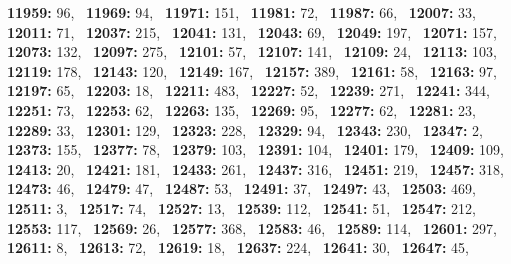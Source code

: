 \textbf{11959:} 96,\allowbreak~ 
\textbf{11969:} 94,\allowbreak~ 
\textbf{11971:} 151,\allowbreak~ 
\textbf{11981:} 72,\allowbreak~ 
\textbf{11987:} 66,\allowbreak~ 
\textbf{12007:} 33,\allowbreak~ 
\textbf{12011:} 71,\allowbreak~ 
\textbf{12037:} 215,\allowbreak~ 
\textbf{12041:} 131,\allowbreak~ 
\textbf{12043:} 69,\allowbreak~ 
\textbf{12049:} 197,\allowbreak~ 
\textbf{12071:} 157,\allowbreak~ 
\textbf{12073:} 132,\allowbreak~ 
\textbf{12097:} 275,\allowbreak~ 
\textbf{12101:} 57,\allowbreak~ 
\textbf{12107:} 141,\allowbreak~ 
\textbf{12109:} 24,\allowbreak~ 
\textbf{12113:} 103,\allowbreak~ 
\textbf{12119:} 178,\allowbreak~ 
\textbf{12143:} 120,\allowbreak~ 
\textbf{12149:} 167,\allowbreak~ 
\textbf{12157:} 389,\allowbreak~ 
\textbf{12161:} 58,\allowbreak~ 
\textbf{12163:} 97,\allowbreak~ 
\textbf{12197:} 65,\allowbreak~ 
\textbf{12203:} 18,\allowbreak~ 
\textbf{12211:} 483,\allowbreak~ 
\textbf{12227:} 52,\allowbreak~ 
\textbf{12239:} 271,\allowbreak~ 
\textbf{12241:} 344,\allowbreak~ 
\textbf{12251:} 73,\allowbreak~ 
\textbf{12253:} 62,\allowbreak~ 
\textbf{12263:} 135,\allowbreak~ 
\textbf{12269:} 95,\allowbreak~ 
\textbf{12277:} 62,\allowbreak~ 
\textbf{12281:} 23,\allowbreak~ 
\textbf{12289:} 33,\allowbreak~ 
\textbf{12301:} 129,\allowbreak~ 
\textbf{12323:} 228,\allowbreak~ 
\textbf{12329:} 94,\allowbreak~ 
\textbf{12343:} 230,\allowbreak~ 
\textbf{12347:} 2,\allowbreak~ 
\textbf{12373:} 155,\allowbreak~ 
\textbf{12377:} 78,\allowbreak~ 
\textbf{12379:} 103,\allowbreak~ 
\textbf{12391:} 104,\allowbreak~ 
\textbf{12401:} 179,\allowbreak~ 
\textbf{12409:} 109,\allowbreak~ 
\textbf{12413:} 20,\allowbreak~ 
\textbf{12421:} 181,\allowbreak~ 
\textbf{12433:} 261,\allowbreak~ 
\textbf{12437:} 316,\allowbreak~ 
\textbf{12451:} 219,\allowbreak~ 
\textbf{12457:} 318,\allowbreak~ 
\textbf{12473:} 46,\allowbreak~ 
\textbf{12479:} 47,\allowbreak~ 
\textbf{12487:} 53,\allowbreak~ 
\textbf{12491:} 37,\allowbreak~ 
\textbf{12497:} 43,\allowbreak~ 
\textbf{12503:} 469,\allowbreak~ 
\textbf{12511:} 3,\allowbreak~ 
\textbf{12517:} 74,\allowbreak~ 
\textbf{12527:} 13,\allowbreak~ 
\textbf{12539:} 112,\allowbreak~ 
\textbf{12541:} 51,\allowbreak~ 
\textbf{12547:} 212,\allowbreak~ 
\textbf{12553:} 117,\allowbreak~ 
\textbf{12569:} 26,\allowbreak~ 
\textbf{12577:} 368,\allowbreak~ 
\textbf{12583:} 46,\allowbreak~ 
\textbf{12589:} 114,\allowbreak~ 
\textbf{12601:} 297,\allowbreak~ 
\textbf{12611:} 8,\allowbreak~ 
\textbf{12613:} 72,\allowbreak~ 
\textbf{12619:} 18,\allowbreak~ 
\textbf{12637:} 224,\allowbreak~ 
\textbf{12641:} 30,\allowbreak~ 
\textbf{12647:} 45,\allowbreak~ 
